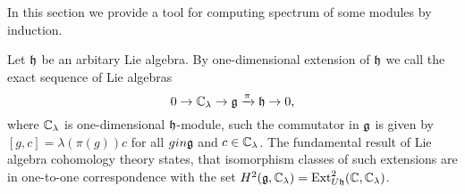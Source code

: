 In this section we provide a tool for computing spectrum of some modules by induction.

Let $\mathfrak{h}$ be an arbitary Lie algebra. By one-dimensional extension of $\mathfrak{h}$ we call the exact
sequence of Lie algebras
\[
    0 \to \mathbb{C}_\lambda\rightarrow \mathfrak{g} \xrightarrow\pi \mathfrak{h} \to 0,
\]
where $\mathbb{C}_\lambda$ is one-dimensional $\mathfrak{h}$-module, such the commutator in $\mathfrak{g}$ is given by
$[g,c] = \lambda(\pi(g))c$ for all $g in \mathfrak{g}$ and $c \in \mathbb{C}_\lambda$.  The fundamental result of
Lie algebra cohomology theory states, that isomorphism classes of such extensions are in one-to-one
correspondence with the set $H^2(\mathfrak{g},\mathbb{C}_\lambda) = \operatorname{Ext}^2_{U\mathfrak{h}}(\mathbb{C}, \mathbb{C}_\lambda)$.
